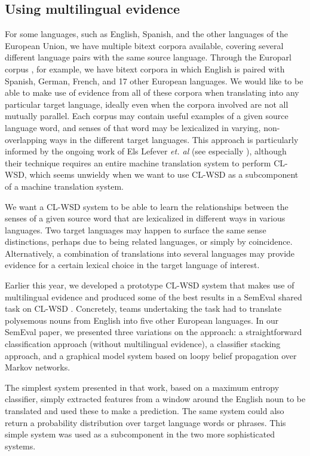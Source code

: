 \subsection{Using multilingual evidence}
For some languages, such as English, Spanish, and the other languages of the
European Union, we have multiple bitext corpora available, covering several
different language pairs with the same source language. Through the Europarl
corpus \cite{europarl}, for example, we have bitext corpora in which English is
paired with Spanish, German, French, and 17 other European languages.
We would like to be able to make use of evidence from all of these corpora when
translating into any particular target language, ideally even when the corpora
involved are not all mutually parallel.
Each corpus may contain useful examples of a given source language word,
and senses of that word may be lexicalized in varying, non-overlapping ways in
the different target languages.
This approach is particularly informed by the ongoing work of Els Lefever
\emph{et. al} (see especially \cite{lefever-hoste-decock:2011:ACL-HLT2011}),
although their technique requires an entire machine translation system to
perform CL-WSD, which seems unwieldy when we want to use CL-WSD as a
subcomponent of a machine translation system.

We want a CL-WSD system to be able to learn the relationships between the
senses of a given source word that are lexicalized in different ways in various
languages.
Two target languages may happen to surface the same sense distinctions, perhaps
due to being related languages, or simply by coincidence.
Alternatively, a combination of translations into several languages may provide
evidence for a certain lexical choice in the target language of interest.

Earlier this year, we developed a prototype CL-WSD system that makes use of
multilingual evidence \cite{rudnick-liu-gasser:2013:SemEval-2013} and produced
some of the best results in a SemEval shared task on CL-WSD \cite{task10}.
Concretely, teams undertaking the task had to translate polysemous nouns from
English into five other European languages.
In our SemEval paper, we presented three variations on the approach:
a straightforward classification approach (without multilingual evidence), a
classifier stacking approach, and a graphical model system based on loopy
belief propagation over Markov networks.

The simplest system presented in that work, based on a maximum entropy
classifier, simply extracted features from a window around the English noun to
be translated and used these to make a prediction. The same system could also
return a probability distribution over target language words or phrases. This
simple system was used as a subcomponent in the two more sophisticated systems.

